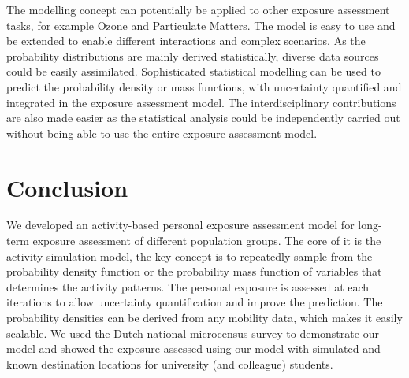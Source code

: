 \documentclass[]{article}
\begin{document}
The modelling concept can potentially be applied to other exposure assessment tasks, for example Ozone and Particulate Matters. The model is easy to use and be extended to enable different interactions and complex scenarios. As the probability distributions are mainly derived statistically, diverse data sources could be easily assimilated. Sophisticated statistical modelling can be used to predict the probability density or mass functions, with uncertainty quantified and integrated in the exposure assessment model. The  interdisciplinary contributions are also made easier as the statistical analysis could be independently carried out without being able to use the entire exposure assessment model. 

\section{Conclusion}
\label{sec:con}

We developed an activity-based personal exposure assessment model for long-term exposure assessment of different population groups. The core of it is the activity simulation model, the key concept is to repeatedly sample from the probability density function or the probability mass function of variables that determines the activity patterns. The personal exposure is assessed at each iterations to allow uncertainty quantification and improve the prediction. The probability densities can be derived from any mobility data, which makes it easily scalable. We used the Dutch national microcensus survey to demonstrate our model and showed the exposure assessed using our model with simulated and known destination locations for university (and colleague) students. 


\newpage


\end{document}
